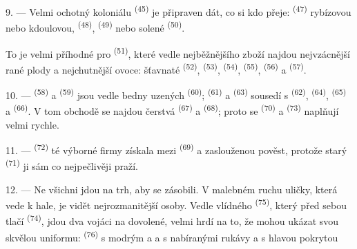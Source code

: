 9. --- Velmi ochotný  koloniálu \textsuperscript{(45)} je připraven dát, co si
kdo přeje:  \textsuperscript{(47)} rybízovou nebo kdoulovou, 
\textsuperscript{(48)},  \textsuperscript{(49)} nebo solené 
\textsuperscript{(50)}.

To je velmi příhodné pro  \textsuperscript{(51)}, které vedle nejběžnějšího
zboží najdou nejvzácnější rané plody a nejchutnější ovoce: šťavnaté
 \textsuperscript{(52)},  \textsuperscript{(53)},
 \textsuperscript{(54)},  \textsuperscript{(55)},
 \textsuperscript{(56)} a  \textsuperscript{(57)}.

\VUsaut{4.0mm}
\VUsaut{3.0mm}

10. ---  \textsuperscript{(58)} a  \textsuperscript{(59)} jsou
vedle bedny uzených  \textsuperscript{(60)}; 
\textsuperscript{(61)} a  \textsuperscript{(63)} sousedí s
 \textsuperscript{(62)},  \textsuperscript{(64)},
 \textsuperscript{(65)} a 
\textsuperscript{(66)}. V tom obchodě se najdou čerstvá  \textsuperscript{(67)}
a  \textsuperscript{(68)}; proto se  \textsuperscript{(70)} a
 \textsuperscript{(73)} naplňují velmi rychle.

11. ---  \textsuperscript{(72)} té výborné firmy získala mezi
 \textsuperscript{(69)} a  zaslouženou pověst,
protože starý  \textsuperscript{(71)} ji sám co nejpečlivěji praží.

\VUsaut{4.0mm}
\VUsaut{3.0mm}

12. --- Ne všichni jdou na trh, aby se zásobili. V malebném ruchu uličky, která vede k hale,
je vidět nejrozmanitější osoby. Vedle vlídného 
\textsuperscript{(75)}, který před sebou tlačí  \textsuperscript{(74)}, jdou
dva vojáci na dovolené, velmi hrdí na to, že mohou ukázat svou skvělou uniformu:
 \textsuperscript{(76)} s modrým
 a  a  s
nabíranými rukávy a s hlavou pokrytou 

